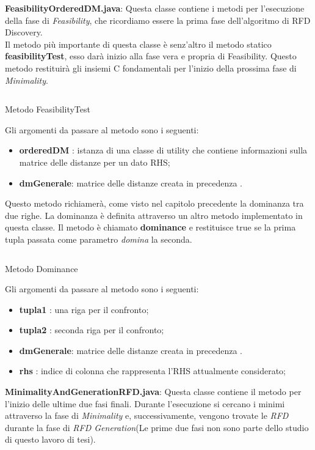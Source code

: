 \textbf{FeasibilityOrderedDM.java}:
Questa classe contiene i metodi per l'esecuzione della fase di \emph{Feasibility}, che ricordiamo essere la prima fase dell'algoritmo di RFD Discovery.\\
Il metodo più importante di questa classe è senz'altro il metodo statico \textbf{feasibilityTest}, esso darà inizio alla fase vera e propria di Feasibility.
Questo metodo restituirà gli insiemi C fondamentali per l'inizio della prossima fase di \emph{Minimality}.
\begin{listing}[H]
	\inputminted[]{java}{Codici/FeasibilityTest.java}
	\caption{Metodo FeasibilityTest}
	\label{Code:4}
\end{listing}
Gli argomenti da passare al metodo sono i seguenti:
\begin{itemize}
	\item \textbf{orderedDM} : istanza di una classe di utility che contiene informazioni sulla matrice delle distanze per un dato RHS;
	\item \textbf{dmGenerale}: matrice delle distanze creata in precedenza .
\end{itemize}
Questo metodo richiamerà, come visto nel capitolo precedente la dominanza tra due righe.
La dominanza è definita attraverso un altro metodo implementato in questa classe.
Il metodo è chiamato \textbf{dominance} e restituisce true se la prima tupla passata come parametro \emph{domina} la seconda.
\begin{listing}[H]
	\inputminted[]{java}{Codici/Dominance.java}
	\caption{Metodo Dominance}
	\label{Code:5}
\end{listing}
Gli argomenti da passare al metodo sono i seguenti:
\begin{itemize}
	\item \textbf{tupla1} : una riga per il confronto;
	\item \textbf{tupla2} : seconda riga per il confronto;
	\item \textbf{dmGenerale}: matrice delle distanze creata in precedenza .
	\item \textbf{rhs} : indice di colonna che rappresenta l'RHS attualmente considerato;
\end{itemize}
\textbf{MinimalityAndGenerationRFD.java}:
Questa classe contiene il metodo per l'inizio delle ultime due fasi finali.
Durante l'esecuzione si cercano i minimi attraverso la fase di \emph{Minimality} e, successivamente, vengono trovate le \emph{RFD} durante la fase di \emph{RFD Generation}(Le prime due fasi non sono parte dello studio di questo lavoro di tesi).
